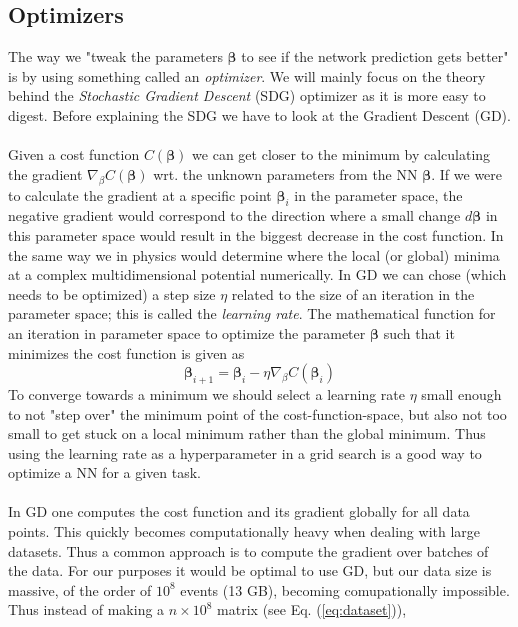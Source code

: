 \documentclass[12pt, a4paper]{book}
\begin{document}
\subsection{Optimizers}\label{sec:SGD}
The way we "tweak the parameters $\bm \beta $ to see if the network prediction gets better" is by using something called an \textit{optimizer}. We will mainly focus on the theory behind the \textit{Stochastic Gradient Descent} (SDG) optimizer as it is more easy to digest. Before explaining the SDG we have to look at the Gradient Descent (GD). \\
\\Given a cost function $C(\bm{\beta})$ we can get closer to the minimum by calculating the gradient $\nabla_{\beta}C(\bm{\beta})$ wrt. the unknown parameters from the NN $\bm\beta$. If we were to calculate the gradient at a specific 
point $\bm{\beta}_i$ in the parameter space, the negative gradient would correspond to the direction where a small change $d\bm\beta$ in this parameter space would result in the biggest decrease in the cost function. 
In the same way we in physics would determine where the local (or global) minima at a complex multidimensional potential numerically. In GD we can chose (which needs to be optimized) a step size $\eta$ related to the size of an iteration in the parameter space; 
this is called the \textit{learning rate}. The mathematical function for an iteration in parameter space to optimize the parameter $\bm{\beta}$ such that it minimizes the cost function is given as
\begin{equation}\label{eq:GD}
    \bm{\beta}_{i+1}=\bm{\beta}_{i} -\eta\nabla_{\beta}C(\bm{\beta}_i)
\end{equation}
To converge towards a minimum we should select a learning rate $\eta$ small enough to not "step over" the minimum point of the cost-function-space, but also not too small to get stuck on a local minimum rather than the global minimum. 
Thus using the learning rate as a hyperparameter in a grid search is a good way to optimize a NN for a given task.\\
\\In GD one computes the cost function and its gradient globally for all data points. This quickly becomes computationally heavy when dealing with large datasets. Thus a common approach is to compute the gradient over batches of the data. 
For our purposes it would be optimal to use GD, but our data size is massive, of the order of $10^{8}$ events (13 GB), becoming comupationally impossible. Thus instead of making a $n\times10^8$ matrix (see Eq. (\ref{eq:dataset})), 
\end{document}
